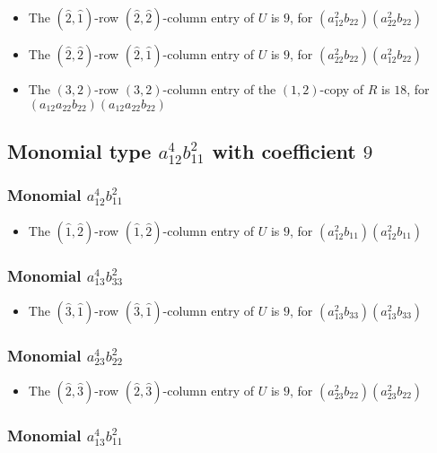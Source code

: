 \documentclass{article}
\begin{document}
\begin{itemize}
\item The $(\hat{2}, \hat{1})$-row $(\hat{2}, \hat{2})$-column entry of $U$ is $9$, for $( a_{12}^{2} b_{22} )( a_{22}^{2} b_{22} )$ 
\item The $(\hat{2}, \hat{2})$-row $(\hat{2}, \hat{1})$-column entry of $U$ is $9$, for $( a_{22}^{2} b_{22} )( a_{12}^{2} b_{22} )$ 
\item The $(3, 2)$-row $(3, 2)$-column entry of the $ \left(1, 2\right) $-copy of $R$ is $ 18 $, for $( a_{12} a_{22} b_{22} )( a_{12} a_{22} b_{22} )$ 
\end{itemize}
\subsection{Monomial type $ a_{12}^{4} b_{11}^{2} $ with coefficient $ 9 $}

\subsubsection{Monomial $ a_{12}^{4} b_{11}^{2} $}

\begin{itemize}
\item The $(\hat{1}, \hat{2})$-row $(\hat{1}, \hat{2})$-column entry of $U$ is $9$, for $( a_{12}^{2} b_{11} )( a_{12}^{2} b_{11} )$ 
\end{itemize}
\subsubsection{Monomial $ a_{13}^{4} b_{33}^{2} $}

\begin{itemize}
\item The $(\hat{3}, \hat{1})$-row $(\hat{3}, \hat{1})$-column entry of $U$ is $9$, for $( a_{13}^{2} b_{33} )( a_{13}^{2} b_{33} )$ 
\end{itemize}
\subsubsection{Monomial $ a_{23}^{4} b_{22}^{2} $}

\begin{itemize}
\item The $(\hat{2}, \hat{3})$-row $(\hat{2}, \hat{3})$-column entry of $U$ is $9$, for $( a_{23}^{2} b_{22} )( a_{23}^{2} b_{22} )$ 
\end{itemize}
\subsubsection{Monomial $ a_{13}^{4} b_{11}^{2} $}
\end{document}
